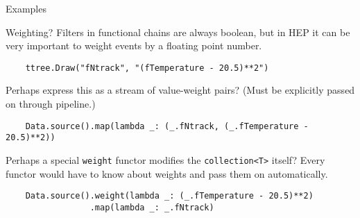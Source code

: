 \documentclass{beamer}
\begin{document}
\begin{frame}[fragile]{Examples}
\begin{block}{Weighting?}
Filters in functional chains are always boolean, but in HEP it can be very important to weight events by a floating point number.

{\scriptsize \begin{verbatim}
    ttree.Draw("fNtrack", "(fTemperature - 20.5)**2")
\end{verbatim}}

Perhaps express this as a stream of value-weight pairs? (Must be explicitly passed on through pipeline.)

{\scriptsize \begin{verbatim}
    Data.source().map(lambda _: (_.fNtrack, (_.fTemperature - 20.5)**2))
\end{verbatim}}

Perhaps a special {\tt weight} functor modifies the {\tt collection<T>} itself? Every functor would have to know about weights and pass them on automatically.

{\scriptsize \begin{verbatim}
    Data.source().weight(lambda _: (_.fTemperature - 20.5)**2)
                 .map(lambda _: _.fNtrack)
\end{verbatim}}
\end{block}
\end{frame}






\end{document}
